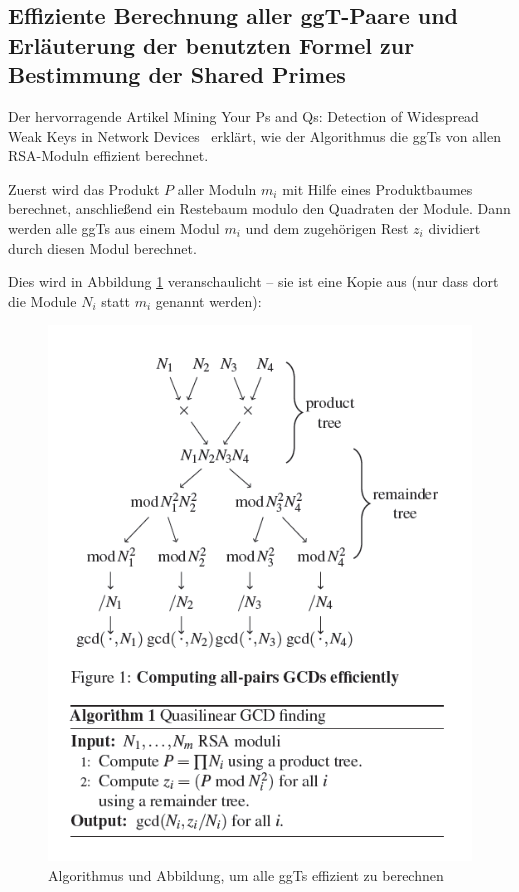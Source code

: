\begin{refsegment}
\section*{Effiziente Berechnung aller ggT-Paare und Erläuterung der benutzten Formel zur Bestimmung der Shared Primes}

Der hervorragende Artikel \glqq Mining Your Ps and Qs: Detection of Widespread Weak Keys in Network Devices\grqq~\cite{Heninger2012} erklärt, wie der Algorithmus die ggTs von allen RSA-Moduln effizient berechnet.

Zuerst wird das Produkt $P$ aller Moduln $m_{i}$ mit Hilfe eines Produktbaumes berechnet, anschließend ein Restebaum modulo den Quadraten der Module. Dann werden alle ggTs aus einem Modul $m_{i}$ und dem zugehörigen Rest $z_{i}$ dividiert durch diesen Modul berechnet.

Dies wird in Abbildung \ref{Figure_Bernstein_Computing-all-pairs-GCDs} veranschaulicht -- sie ist eine Kopie aus \cite{Heninger2012} (nur dass dort die Module $N_{i}$ statt $m_{i}$ genannt werden):
\begin{figure}[ht]
\begin{center}
\includegraphics[scale=0.7]{figures/Bernstein_Computing-all-pairs-GCDs.png}
\caption{Algorithmus und Abbildung, um alle ggTs effizient zu berechnen}
\label{Figure_Bernstein_Computing-all-pairs-GCDs}
\end{center}
\end{figure}



\end{refsegment}
